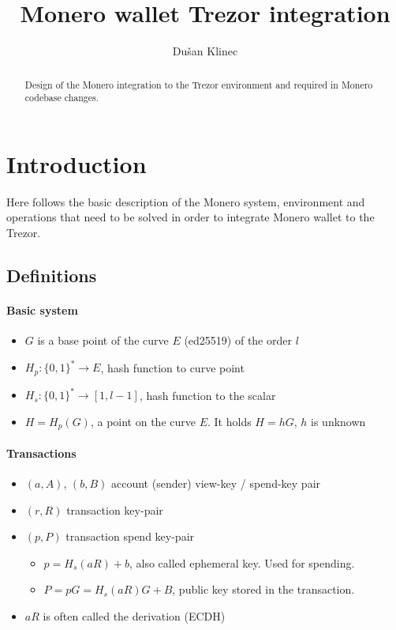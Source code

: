 \documentclass[]{article}
\title{Monero wallet Trezor integration}
\author{Du\v{s}an Klinec}
\begin{document}
\maketitle

\begin{abstract}
Design of the Monero integration to the Trezor environment and required in Monero codebase changes.
\end{abstract}

\section{Introduction}
Here follows the basic description of the Monero system, environment and operations that need to be solved in order to integrate Monero wallet to the Trezor.

\subsection{Definitions}

\paragraph{Basic system}

\begin{itemize}
	\item $G$ is a base point of the curve $E$ (ed25519) of the order $l$
	\item $H_p : \{0,1\}^* \rightarrow E$, hash function to curve point
	\item $H_s : \{0,1\}^* \rightarrow [1, l-1]$, hash function to the scalar
	\item $H = H_p(G)$, a point on the curve $E$. It holds $H=hG$, $h$ is unknown
	
\end{itemize}

\paragraph{Transactions}

\begin{itemize}
	\item $(a, A)$, $(b, B)$ account (sender) view-key / spend-key pair
	\item $(r, R)$ transaction key-pair 
	\item $(p, P)$ transaction spend key-pair
	\begin{itemize}
		\item $p = H_s(aR) + b$, also called ephemeral key. Used for spending.
		\item $P = pG = H_s(aR)G + B$, public key stored in the transaction.
	\end{itemize}
	\item $aR$ is often called the derivation (ECDH)
\end{itemize}
\end{document}
